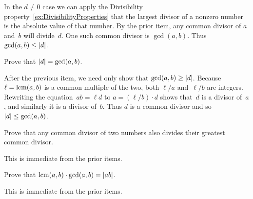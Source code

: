 \documentclass{ibl}  %
\begin{document}
\begin{euclidproof}
\begin{problem}
\begin{exes}
\begin{answer}
  In the $d\neq 0$ case we can apply the 
  Divisibility property~\ref{ex:DivisibilityProperties} that the
  largest divisor of a nonzero number is the absolute value of that number.
  By the prior item, any common divisor of $a$ and~$b$ will divide~$d$.
  One such common divisor is $\gcd(a,b)$.
  Thus $\gcd(a,b)\leq\lvert d\rvert$.  
\end{answer}
\begin{exercise} 
  Prove that $\lvert d\rvert=\gcd(a,b)$. 
\end{exercise}
\begin{answer}
  After the previous item, we need only show that $\gcd(a,b)\geq\lvert d\rvert$. 
  Because $\ell=\operatorname{lcm}(a,b)$ is a common multiple of the two, 
  both $\ell/a$ and~$\ell/b$ are integers. 
  Rewriting the equation~$ab=\ell d$ to 
  $a=(\ell/b)\cdot d$ shows that~$d$ is a divisor of~$a$, and similarly
  it is a divisor of~$b$.
  Thus $d$ is a common divisor and so $\lvert d\rvert\leq \gcd(a,b)$.  
\end{answer}
\begin{exercise} 
  Prove that any common divisor of two numbers also divides their
  greatest common divisor.
\end{exercise}
\begin{answer}
  This is immediate from the prior items.  
\end{answer}
\begin{exercise} 
  Prove that $\operatorname{lcm}(a,b)\cdot\gcd(a,b)=\lvert ab\rvert$. 
\end{exercise}
\begin{answer}
  This is immediate from the prior items.
\end{answer}
\end{exes}  


\end{problem}
\end{euclidproof}
\end{document}
